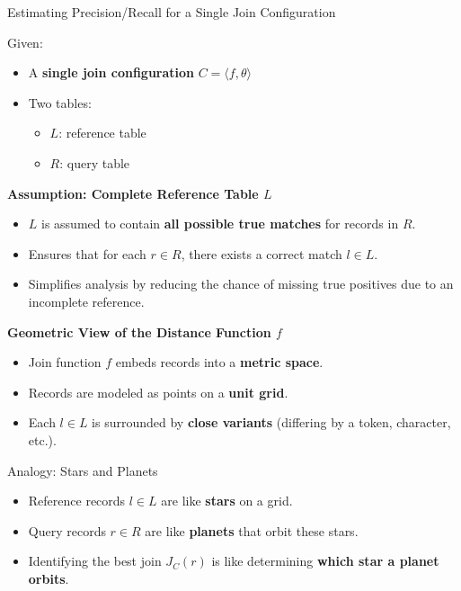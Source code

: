 \documentclass[8pt]{beamer} %
\begin{document}
\begin{frame}{Estimating Precision/Recall for a Single Join Configuration}
	
	Given:
	\begin{itemize}
		\item A \textbf{single join configuration} $C = \langle f, \theta \rangle$
		\item Two tables:
		\begin{itemize}
			\item $L$: reference table
			\item $R$: query table
		\end{itemize}
	\end{itemize}
	
	\vspace{0.5em}
	\textbf{Assumption: Complete Reference Table $L$}
	\begin{itemize}
		\item $L$ is assumed to contain \textbf{all possible true matches} for records in $R$.
		\item Ensures that for each $r \in R$, there exists a correct match $l \in L$.
		\item Simplifies analysis by reducing the chance of missing true positives due to an incomplete reference.
	\end{itemize}
	
	\vspace{0.5em}
	\textbf{Geometric View of the Distance Function $f$}
	\begin{itemize}
		\item Join function $f$ embeds records into a \textbf{metric space}.
		\item Records are modeled as points on a \textbf{unit grid}.
		\item Each $l \in L$ is surrounded by \textbf{close variants} (differing by a token, character, etc.).
	\end{itemize}
	
	\vspace{0.5em}
	\begin{block}{Analogy: Stars and Planets}
		\begin{itemize}
			\item Reference records $l \in L$ are like \textbf{stars} on a grid.
			\item Query records $r \in R$ are like \textbf{planets} that orbit these stars.
			\item Identifying the best join $J_C(r)$ is like determining \textbf{which star a planet orbits}.
		\end{itemize}
	\end{block}
	
\end{frame}
\end{document}
